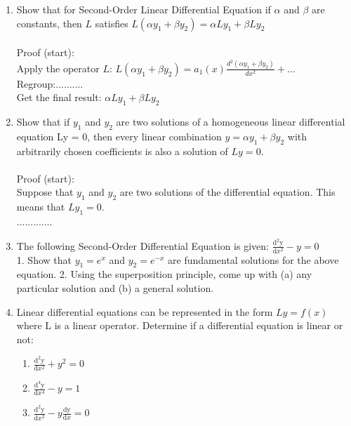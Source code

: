 {\begin{enumerate}
 \item  Show that for Second-Order Linear Differential Equation if $\alpha$ and $\beta$ are constants, then $L$ satisfies $L(\alpha y_{1}+\beta y_{2})=\alpha Ly_{1}+\beta Ly_{2}$\\\\
Proof (start):\\
Apply the operator $L$: $L(\alpha y_{1}+\beta y_{2})=a_{1}(x)\frac{{d}^2(\alpha y_{1}+\beta y_{2})}{{d}x^2}+...$\\
Regroup:..........\\
Get the final result: $\alpha Ly_{1}+\beta Ly_{2}$ 
 \item Show that if $y_{1}$ and $y_{2}$ are two solutions of a homogeneous linear differential equation Ly = 0, then every linear combination $y=\alpha y_{1} + \beta y_{2}$ with arbitrarily chosen coefficients is also a solution of $Ly = 0$.\\\\
Proof (start):\\
Suppose that $y_{1}$ and $y_{2}$ are two solutions of the differential equation. This means that $Ly_{1}=0.$\\
.............
\item The following Second-Order Differential Equation is given:
$\frac{\mathrm{d^2y} }{\mathrm{d} x^2} - y=0$\\
1. Show that $y_{1}=e^x$ and $y_{2}=e^{-x}$ are fundamental solutions for the above equation.
2. Using the superposition principle, come up with (a) any particular solution and (b) a general solution.

\item Linear differential equations can be represented in the form $Ly=f(x)$ where L is a linear operator.
Determine if a differential equation is linear or not:
\begin{enumerate}
\item $ \frac{\mathrm{d^2y} }{\mathrm{d} x^2} +y^2 =0$
\item $ \frac{\mathrm{d^4y} }{\mathrm{d} x^4} -y=1$
\item $ \frac{\mathrm{d^2y} }{\mathrm{d} x^2} -y \frac{\mathrm{dy} }{\mathrm{d} x} =0$
\end{enumerate}

\end{enumerate}

}

